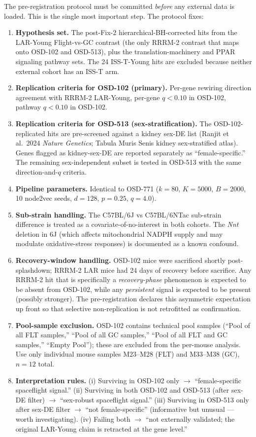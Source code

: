 \documentclass[11pt]{article}
\begin{document}
The pre-registration protocol must be committed \emph{before} any external data is loaded. This is the single most important step. The protocol fixes:

\begin{enumerate}[leftmargin=*]
\item \textbf{Hypothesis set.} The post-Fix-2 hierarchical-BH-corrected hits from the LAR-Young Flight-vs-GC contrast (the only RRRM-2 contrast that maps onto OSD-102 and OSD-513), plus the translation-machinery and PPAR signaling pathway sets. The 24 ISS-T-Young hits are excluded because neither external cohort has an ISS-T arm.
\item \textbf{Replication criteria for OSD-102 (primary).} Per-gene rewiring direction agreement with RRRM-2 LAR-Young, per-gene $q<0.10$ in OSD-102, pathway $q<0.10$ in OSD-102.
\item \textbf{Replication criteria for OSD-513 (sex-stratification).} The OSD-102-replicated hits are pre-screened against a kidney sex-DE list (Ranjit et al.\ 2024 \emph{Nature Genetics}; Tabula Muris Senis kidney sex-stratified atlas). Genes flagged as kidney-sex-DE are reported separately as ``female-specific.'' The remaining sex-independent subset is tested in OSD-513 with the same direction-and-$q$ criteria.
\item \textbf{Pipeline parameters.} Identical to OSD-771 ($k{=}80$, $K{=}5000$, $B{=}2000$, 10 node2vec seeds, $d{=}128$, $p{=}0.25$, $q{=}4.0$).
\item \textbf{Sub-strain handling.} The C57BL/6J vs C57BL/6NTac sub-strain difference is treated as a covariate-of-no-interest in both cohorts. The \emph{Nnt} deletion in 6J (which affects mitochondrial NADPH supply and may modulate oxidative-stress responses) is documented as a known confound.
\item \textbf{Recovery-window handling.} OSD-102 mice were sacrificed shortly post-splashdown; RRRM-2 LAR mice had 24 days of recovery before sacrifice. Any RRRM-2 hit that is specifically a \emph{recovery-phase} phenomenon is expected to be absent from OSD-102, while any \emph{persistent} signal is expected to be present (possibly stronger). The pre-registration declares this asymmetric expectation up front so that selective non-replication is not retrofitted as confirmation.
\item \textbf{Pool-sample exclusion.} OSD-102 contains technical pool samples (``Pool of all FLT samples,'' ``Pool of all GC samples,'' ``Pool of all FLT and GC samples,'' ``Empty Pool''); these are excluded from the per-mouse analysis. Use only individual mouse samples M23--M28 (FLT) and M33--M38 (GC), $n{=}12$ total.
\item \textbf{Interpretation rules.} (i) Surviving in OSD-102 only $\to$ ``female-specific spaceflight signal.'' (ii) Surviving in both OSD-102 and OSD-513 (after sex-DE filter) $\to$ ``sex-robust spaceflight signal.'' (iii) Surviving in OSD-513 only after sex-DE filter $\to$ ``not female-specific'' (informative but unusual --- worth investigating). (iv) Failing both $\to$ ``not externally validated; the original LAR-Young claim is retracted at the gene level.''
\end{enumerate}
\end{document}
